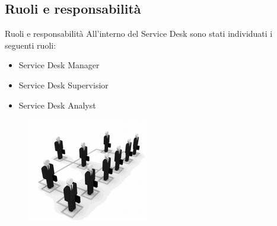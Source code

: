 \subsection*{Ruoli e responsabilità}
\begin{frame}{Ruoli e responsabilità}
All'interno del Service Desk sono stati individuati i seguenti ruoli:
\begin{itemize}
\item{Service Desk Manager}
\item{Service Desk Supervisior}
\item{Service Desk Analyst}
\end{itemize}
\begin{figure}
\includegraphics[scale=0.4]{Images/Roles.png}
\end{figure}
\end{frame}

